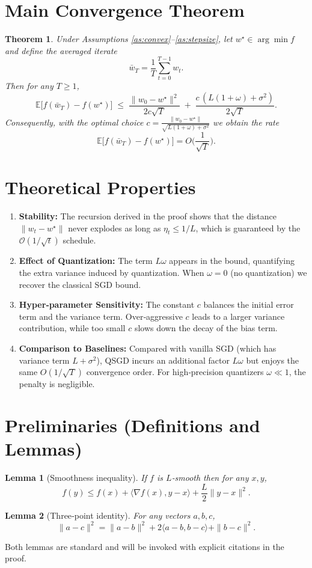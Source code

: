 \documentclass{article}
\newtheorem{theorem}{Theorem}
\newtheorem{lemma}{Lemma}
\newcommand{\EE}{\mathbb{E}}
\begin{document}
\section*{Main Convergence Theorem}
\begin{theorem}\label{thm:conv}
Under Assumptions \ref{as:convex}–\ref{as:stepsize}, let $w^\star\in\arg\min f$ and define the averaged iterate 
\[
\bar w_T=\frac1T\sum_{t=0}^{T-1}w_t .
\]
Then for any $T\ge1$,
\[
\EE\!\big[f(\bar w_T)-f(w^\star)\big]\;\le\;
\frac{\|w_0-w^\star\|^2}{2c\sqrt{T}}
\;+\;
\frac{c\,(L(1+\omega)+\sigma^2)}{2\sqrt{T}} .
\]
Consequently, with the optimal choice $c=\frac{\|w_0-w^\star\|}{\sqrt{L(1+\omega)+\sigma^2}}$ we obtain the rate
\[
\EE\!\big[f(\bar w_T)-f(w^\star)\big]=O\!\Big(\frac{1}{\sqrt{T}}\Big).
\]
\end{theorem}

\section*{Theoretical Properties}
\begin{enumerate}
\item \textbf{Stability:} The recursion derived in the proof shows that the distance $\|w_t-w^\star\|$ never explodes as long as $\eta_t\le 1/L$, which is guaranteed by the $\mathcal{O}(1/\sqrt{t})$ schedule.
\item \textbf{Effect of Quantization:} The term $L\omega$ appears in the bound, quantifying the extra variance induced by quantization. When $\omega=0$ (no quantization) we recover the classical SGD bound.
\item \textbf{Hyper‑parameter Sensitivity:} The constant $c$ balances the initial error term and the variance term. Over‑aggressive $c$ leads to a larger variance contribution, while too small $c$ slows down the decay of the bias term.
\item \textbf{Comparison to Baselines:} Compared with vanilla SGD (which has variance term $L+\sigma^2$), QSGD incurs an additional factor $L\omega$ but enjoys the same $O(1/\sqrt{T})$ convergence order. For high‑precision quantizers $\omega\ll1$, the penalty is negligible.
\end{enumerate}

\section*{Preliminaries (Definitions and Lemmas)}
\begin{lemma}[Smoothness inequality]\label{lem:smooth}
If $f$ is $L$‑smooth then for any $x,y$,
\[
f(y)\le f(x)+\langle\nabla f(x),y-x\rangle+\frac{L}{2}\|y-x\|^2 .
\]
\end{lemma}
\begin{lemma}[Three‑point identity]\label{lem:three}
For any vectors $a,b,c$,
\[
\|a-c\|^2 = \|a-b\|^2 + 2\langle a-b, b-c\rangle + \|b-c\|^2 .
\]
\end{lemma}
Both lemmas are standard and will be invoked with explicit citations in the proof.
\end{document}
